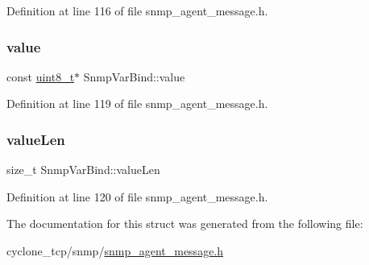 Definition at line 116 of file snmp\+\_\+agent\+\_\+message.\+h.

\mbox{\label{structSnmpVarBind_aabc0d16bdeda309727b03a0ef6a5e02e}} 
\subsubsection{\texorpdfstring{value}{value}}
{\footnotesize\ttfamily const \hyperlink{stdint_8h_aba7bc1797add20fe3efdf37ced1182c5}{uint8\+\_\+t}$\ast$ Snmp\+Var\+Bind\+::value}



Definition at line 119 of file snmp\+\_\+agent\+\_\+message.\+h.

\mbox{\label{structSnmpVarBind_aaace175470aa86de3efbf635f0fcd06f}} 
\subsubsection{\texorpdfstring{value\+Len}{valueLen}}
{\footnotesize\ttfamily size\+\_\+t Snmp\+Var\+Bind\+::value\+Len}



Definition at line 120 of file snmp\+\_\+agent\+\_\+message.\+h.



The documentation for this struct was generated from the following file\+:\begin{DoxyCompactItemize}
\item 
cyclone\+\_\+tcp/snmp/\hyperlink{snmp__agent__message_8h}{snmp\+\_\+agent\+\_\+message.\+h}\end{DoxyCompactItemize}
